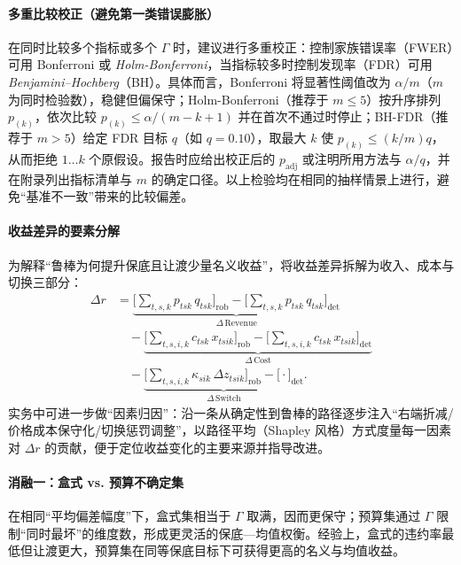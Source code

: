 \paragraph{多重比较校正（避免第一类错误膨胀）}
在同时比较多个指标或多个 $\Gamma$ 时，建议进行多重校正：控制家族错误率（FWER）可用 Bonferroni 或 \emph{Holm-Bonferroni}，当指标较多时控制发现率（FDR）可用 \emph{Benjamini–Hochberg}（BH）。具体而言，Bonferroni 将显著性阈值改为 $\alpha/m$（$m$ 为同时检验数），稳健但偏保守；Holm-Bonferroni（推荐于 $m\le5$）按升序排列 $p_{(k)}$，依次比较 $p_{(k)}\le \alpha/(m-k+1)$ 并在首次不通过时停止；BH-FDR（推荐于 $m>5$）给定 FDR 目标 $q$（如 $q=0.10$），取最大 $k$ 使 $p_{(k)}\le (k/m)q$，从而拒绝 $1\ldots k$ 个原假设。报告时应给出校正后的 $p_{\mathrm{adj}}$ 或注明所用方法与 $\alpha/q$，并在附录列出指标清单与 $m$ 的确定口径。以上检验均在相同的抽样情景上进行，避免“基准不一致”带来的比较偏差。

\paragraph{收益差异的要素分解}
为解释“鲁棒为何提升保底且让渡少量名义收益”，将收益差异拆解为收入、成本与切换三部分：
\begin{equation}
  \begin{aligned}
    \Delta r
    &= \underbrace{\bigl[\sum_{t,s,k} p_{tsk} \, q_{tsk}\bigr]_{\mathrm{rob}} -
                    \bigl[\sum_{t,s,k} p_{tsk} \, q_{tsk}\bigr]_{\mathrm{det}}}_{\Delta \, \mathrm{Revenue}} \\
    &\quad - \underbrace{\bigl[\sum_{t,s,i,k} c_{tsk} \, x_{tsik}\bigr]_{\mathrm{rob}} -
                    \bigl[\sum_{t,s,i,k} c_{tsk} \, x_{tsik}\bigr]_{\mathrm{det}}}_{\Delta \, \mathrm{Cost}} \\
    &\quad - \underbrace{\bigl[\sum_{t,s,i,k} \kappa_{sik}\,\Delta z_{tsik}\bigr]_{\mathrm{rob}} -
                    \bigl[\cdot\bigr]_{\mathrm{det}}}_{\Delta \, \mathrm{Switch}}.
  \end{aligned}
\end{equation}
实务中可进一步做“因素归因”：沿一条从确定性到鲁棒的路径逐步注入“右端折减/价格成本保守化/切换惩罚调整”，以路径平均（Shapley 风格）方式度量每一因素对 $\Delta r$ 的贡献，便于定位收益变化的主要来源并指导改进。

\paragraph{消融一：盒式 vs. 预算不确定集}
在相同“平均偏差幅度”下，盒式集相当于 $\Gamma$ 取满，因而更保守；预算集通过 $\Gamma$ 限制“同时最坏”的维度数，形成更灵活的保底—均值权衡。经验上，盒式的违约率最低但让渡更大，预算集在同等保底目标下可获得更高的名义与均值收益。

